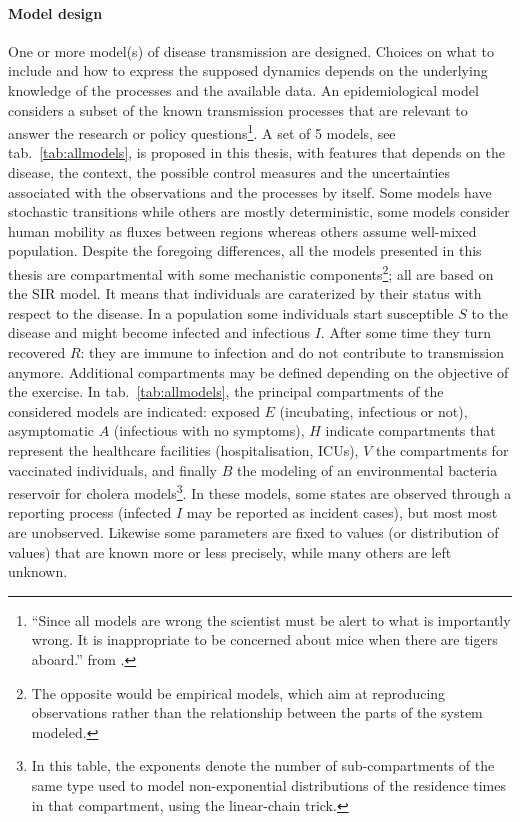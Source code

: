 \paragraph{Model design} One or more model(s) of disease transmission are designed. Choices on what to include and how to express the supposed dynamics depends on the underlying knowledge of the processes and the available data. An epidemiological model considers a subset of the known transmission processes that are relevant to answer the research or policy questions\footnote[][]{“Since all models are wrong the scientist must be alert to what is importantly wrong. It is inappropriate to be concerned about mice when there are tigers aboard.” from .}. A set of 5 models, see tab.~\ref{tab:allmodels}, is proposed in this thesis, with features that depends on the disease, the context, the possible control measures and the uncertainties associated with the observations and the processes by itself. Some models have stochastic transitions while others are mostly deterministic, some models consider human mobility as fluxes between regions whereas others assume well-mixed population. Despite the foregoing differences, all the models presented in this thesis are compartmental with some mechanistic components\footnote{The opposite would be empirical models, which aim at reproducing observations rather than the relationship between the parts of the system modeled.}; all are based on the SIR model. It means that individuals are caraterized by their status with respect to the disease. In a population some individuals start susceptible $S$ to the disease and might become infected and infectious $I$. After some time they turn recovered $R$: they are immune to infection and do not contribute to transmission anymore. %
Additional compartments may be defined depending on the objective of the exercise. In tab.~\ref{tab:allmodels}, the principal compartments of the considered models are indicated: exposed $E$ (incubating, infectious or not), asymptomatic $A$ (infectious with no symptoms), $H$ indicate compartments that represent the healthcare facilities (hospitalisation, ICUs), $V$ the compartments for vaccinated individuals, and finally $B$ the modeling of an environmental bacteria reservoir for cholera models\footnote{In this table, the exponents denote the number of sub-compartments of the same type used to model non-exponential distributions of the residence times in that compartment, using the linear-chain trick.}.
In these models, some states are observed through a reporting process (\eg infected $I$ may be reported as incident cases), but most most are unobserved. Likewise some parameters are fixed to values (or distribution of values) that are known more or less precisely, while many others are left unknown.

